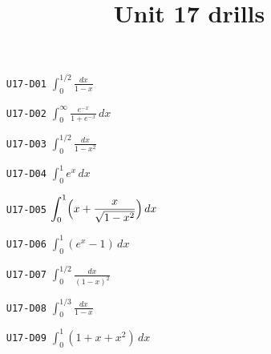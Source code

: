
\title{Unit 17 drills}

\maketitle
\begin{enumerate}
  \item[\texttt{U17-D01}] $\displaystyle\int_{0}^{1/2}\frac{dx}{1-x}$
  \item[\texttt{U17-D02}] $\displaystyle\int_{0}^{\infty}\frac{e^{-x}}{1+e^{-x}}\,dx$
  \item[\texttt{U17-D03}] $\displaystyle\int_{0}^{1/2}\frac{dx}{1-x^{2}}$
  \item[\texttt{U17-D04}] $\displaystyle\int_{0}^{1}e^{x}\,dx$
  \item[\texttt{U17-D05}] $\displaystyle\int_{0}^{1}\Bigl(x+\frac{x}{\sqrt{1-x^{2}}}\Bigr)\,dx$
  \item[\texttt{U17-D06}] $\displaystyle\int_{0}^{1}(e^{x}-1)\,dx$
  \item[\texttt{U17-D07}] $\displaystyle\int_{0}^{1/2}\frac{dx}{(1-x)^{2}}$
  \item[\texttt{U17-D08}] $\displaystyle\int_{0}^{1/3}\frac{dx}{1-x}$
  \item[\texttt{U17-D09}] $\displaystyle\int_{0}^{1}(1+x+x^{2})\,dx$
\end{enumerate}

